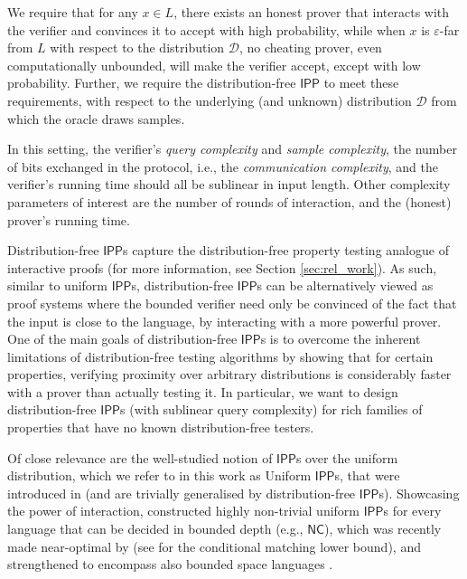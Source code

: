 \documentclass[10pt,a4paper]{article}
\newcommand{\NC}{\mathsf{NC}}
\newcommand{\IPP}{\mathsf{IPP}}
\newcommand{\sD}{\mathcal{D}}
\begin{document}
We require that for any $x \in L$, there exists an honest prover that interacts with the verifier and convinces it to accept with high probability,
while when $x$ is $\varepsilon$-far from $L$ with respect to the distribution $\sD$, no cheating prover, even computationally unbounded, will make the verifier accept, except with low probability.
Further, we require the distribution-free $\IPP$ to meet these requirements, with respect to the underlying (and unknown) distribution $\sD$ from which the oracle draws samples.

In this setting, the verifier's \textit{query complexity} and \textit{sample complexity}, the number of bits exchanged in the protocol, i.e., the \textit{communication complexity}, and the verifier's running time should all be sublinear in input length. Other complexity parameters of interest are the number of rounds of interaction, and the (honest) prover's running time.

Distribution-free $\IPP$s capture the distribution-free property testing analogue of interactive proofs (for more information, see Section \ref{sec:rel_work}). As such, similar to uniform $\IPP$s, distribution-free $\IPP$s can be alternatively viewed as proof systems where the bounded verifier need only be convinced of the fact that the input is close to the language, by interacting with a more powerful prover. One of the main goals of distribution-free $\IPP$s is to overcome the inherent limitations of distribution-free testing algorithms by showing that for certain properties, verifying proximity over arbitrary distributions is considerably faster with a prover than actually testing it. In particular, we want to design distribution-free $\IPP$s (with sublinear query complexity) for rich families of properties that have no known distribution-free testers.

Of close relevance are the well-studied notion of $\IPP$s over the uniform distribution, which we refer to in this work as Uniform $\IPP$s, that were introduced in \cite{EKR04,RVW} (and are trivially generalised by distribution-free $\IPP$s). Showcasing the power of interaction, \cite{RVW} constructed highly non-trivial uniform $\IPP$s for every language that can be decided in bounded depth (e.g., $\NC$), which was recently made near-optimal by \cite{RR20_batch_polylog} (see \cite{KR15} for the conditional matching lower bound), and strengthened to encompass also bounded space languages \cite{RRR21}. 
\end{document}
